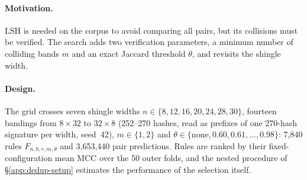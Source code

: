 \paragraph{Motivation.} LSH is needed on the corpus to avoid comparing all
pairs, but its collisions must be verified. The search adds two verification
parameters, a minimum number of colliding bands $m$ and an exact Jaccard
threshold $\theta$, and revisits the shingle width.

\paragraph{Design.} The grid crosses seven shingle widths
$n\in\{8,12,16,20,24,28,30\}$, fourteen bandings from $8{\times}32$ to
$32{\times}8$ (252--270 hashes, read as prefixes of one 270-hash signature per
width, seed~42), $m\in\{1,2\}$ and $\theta\in\{\text{none}, 0.60, 0.61,
\dots, 0.98\}$: 7,840 rules $F_{n,b,r,m,\theta}$ and 3,653,440 pair
predictions. Rules are ranked by their fixed-configuration mean MCC over the
50 outer folds, and the nested procedure of \S\ref{app:dedup-setup} estimates
the performance of the selection itself.

